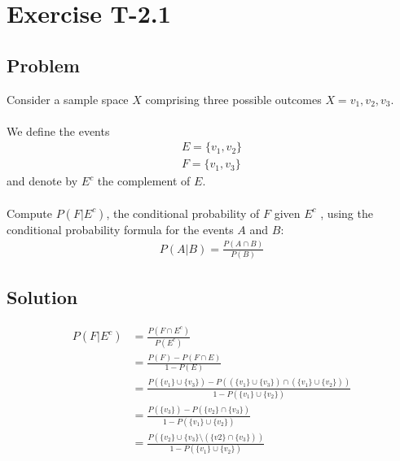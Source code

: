 \section*{Exercise T-2.1}

\subsection*{Problem}
Consider a sample space $X$ comprising three possible outcomes $X = {v_1, v_2, v_3}$.\\ \\
We define the events
\begin{align}
	E = \{v_1,v_2\} \nonumber \\
	F = \{v_1,v_3\}\nonumber 
\end{align}
and denote by $E^c$ the complement of $E$.\\ \\
Compute $P(F|E^c)$, the conditional probability of $F$ given $E^c$ , using the conditional
probability formula for the events $A$ and $B$:\\

\begin{align}
P(A|B)=  \frac{P(A \cap B)}{P(B)} \nonumber 
\end{align}


\subsection*{Solution}

\begin{align}
	P(F|E^c) &= \frac{P(F\cap E^c)}{P(E^c)} \nonumber \\
	&= \frac{P(F) - P(F \cap E)}{1 - P(E)} \nonumber \\
	&= \frac{P( \{v_1\} \cup \{v_3\} ) - P(( \{v_1\} \cup \{v_3\} ) \cap (\{v_1\} \cup \{v_2\}))}{1 - P(\{v_1\} \cup \{v_2\})} \nonumber \\
	&= \frac{P(\{v_3\} ) - P(\{v_2\} \cap \{v_3\})}{1 - P(\{v_1\} \cup \{v_2\})} \nonumber \\
	&= \frac{P(\{v_2\} \cup \{v_3\} \setminus (\{v2\} \cap \{v_3\}))}{1 - P(\{v_1\} \cup \{v_2\})} \nonumber
\end{align}
